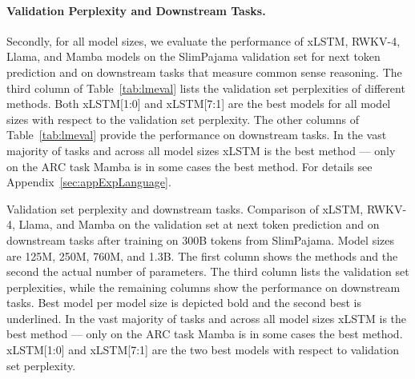 \documentclass[dvipsnames]{article}
\begin{document}
\vspace{-0.25cm}
\paragraph{Validation Perplexity and Downstream Tasks.}
\label{sec:spaj_downstream_eval}
Secondly, for all model sizes, we evaluate the 
performance of xLSTM, RWKV-4, Llama, and Mamba models
on the SlimPajama validation set for next token prediction and 
on downstream tasks that measure common sense reasoning.
The third column of 
Table~\ref{tab:lmeval} lists the validation set perplexities of different methods.
Both xLSTM[1:0] and xLSTM[7:1] are the best models for
all model sizes
with respect to the validation set perplexity.
The other columns of 
Table~\ref{tab:lmeval} provide the performance on downstream tasks.
In the vast majority of tasks and across all model sizes 
xLSTM is the best method --- only on the ARC task Mamba is
in some cases the best method.
For details see Appendix~\ref{sec:appExpLanguage}. 


\begin{table}[htbp]
    \centering
    \begin{adjustbox}{width=\textwidth}
        
    \end{adjustbox}
    \vspace{0.1cm}
    \caption{Validation set perplexity and downstream tasks. 
    Comparison of xLSTM, RWKV-4, Llama, and Mamba
    on the validation set at next token prediction and on downstream tasks 
    after training on 300B tokens from SlimPajama. 
    Model sizes are 125M, 250M, 760M, 
    and 1.3B. The first column shows the methods and
    the second the actual number of parameters. 
    The third column lists the validation set perplexities,
    while the remaining columns
    show the performance on downstream tasks.
    Best model per model size is depicted bold and the second best 
    is underlined.
    In the vast majority of tasks and 
    across all model sizes xLSTM is the best method --- 
    only on the ARC task Mamba is 
    in some cases the best method.
    xLSTM[1:0] and xLSTM[7:1] are the two best models
    with respect to validation set perplexity.
    \label{tab:lmeval}
}  
\end{table}
\end{document}
